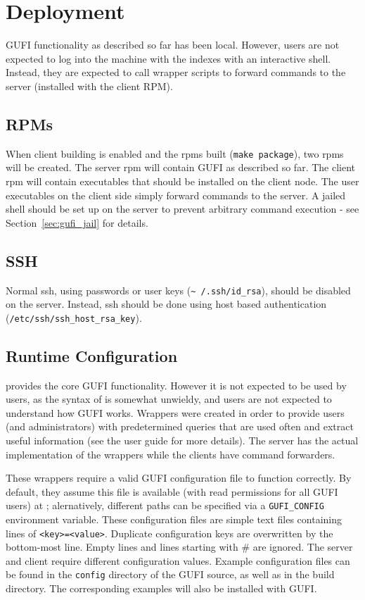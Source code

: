 \section{Deployment}
\label{sec:deploy}
GUFI functionality as described so far has been local. However, users
are not expected to log into the machine with the indexes with an
interactive shell. Instead, they are expected to call wrapper scripts
to forward commands to the server (installed with the client RPM).

\subsection{RPMs}
When client building is enabled and the rpms built (\texttt{make
  package}), two rpms will be created. The server rpm will contain
GUFI as described so far. The client rpm will contain executables that
should be installed on the client node. The user executables on the
client side simply forward commands to the server. A jailed shell
should be set up on the server to prevent arbitrary command execution
- see Section~\ref{sec:gufi_jail} for details.

\subsection{SSH}
Normal ssh, using passwords or user keys (\texttt{\textasciitilde
  /.ssh/id\_rsa}), should be disabled on the server. Instead, ssh
should be done using host based authentication
(\texttt{/etc/ssh/ssh\_host\_rsa\_key}).

\subsection{Runtime Configuration}
\gufiquery provides the core GUFI functionality. However it is not
expected to be used by users, as the syntax of \gufiquery is somewhat
unwieldy, and users are not expected to understand how GUFI
works. Wrappers were created in order to provide users (and
administrators) with predetermined queries that are used often and
extract useful information (see the user guide for more details). The
server has the actual implementation of the wrappers while the clients
have command forwarders.

These wrappers require a valid GUFI configuration file to function correctly.
By default, they assume this file is available (with read permissions for all
GUFI users) at \guficonfigfile; alernatively, different paths can be specified
via a \texttt{GUFI_CONFIG} environment variable. These configuration files are
simple text files containing lines of \texttt{<key>=<value>}.  Duplicate
configuration keys are overwritten by the bottom-most line. Empty lines and
lines starting with \# are ignored. The server and client require different
configuration values. Example configuration files can be found in the
\texttt{config} directory of the GUFI source, as well as in the build
directory. The corresponding examples will also be installed with GUFI.

